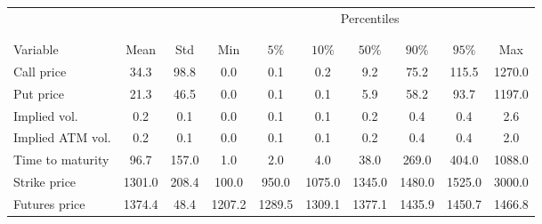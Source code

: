 \begin{center} 
 \begin{tabular*}{\textwidth}{@{\extracolsep{\fill}}lccccccccc} 
 \toprule 
 \multicolumn{4}{c}{} & \multicolumn{5}{c}{Percentiles} & \multicolumn{1}{c}{}\\ 
 \cline{5-9}\\ 
 \multicolumn{4}{c}{}\\ 
Variable & Mean & Std& Min &$5\%$& $10\%$& $50\%$ & $90\%$ & $95\%$& Max  \\ 
 \midrule 
Call price             & 34.3& 98.8& 0.0& 0.1& 0.2& 9.2& 75.2& 115.5& 1270.0\\ 
Put price              & 21.3& 46.5& 0.0& 0.1& 0.1& 5.9& 58.2& 93.7& 1197.0\\ 
Implied vol.       & 0.2& 0.1& 0.0& 0.1& 0.1& 0.2& 0.4& 0.4& 2.6\\ 
Implied ATM vol.    & 0.2& 0.1& 0.0& 0.1& 0.1& 0.2& 0.4& 0.4& 2.0\\ 
Time to maturity & 96.7& 157.0& 1.0& 2.0& 4.0& 38.0& 269.0& 404.0& 1088.0\\ 
Strike price       & 1301.0& 208.4& 100.0& 950.0& 1075.0& 1345.0& 1480.0& 1525.0& 3000.0\\ 
Futures price       & 1374.4& 48.4& 1207.2& 1289.5& 1309.1& 1377.1& 1435.9& 1450.7& 1466.8\\ 
     \hline 
\bottomrule 
\end{tabular*} 
\end{center}